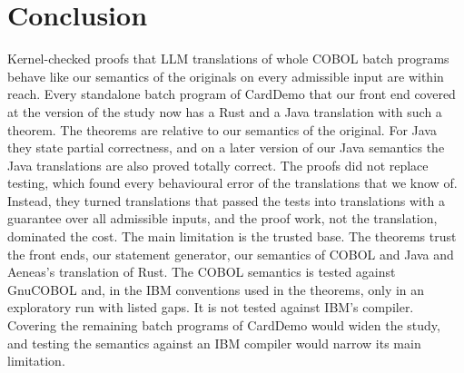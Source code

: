 \section{Conclusion}
\label{sec:conclusion}

Kernel-checked proofs that LLM translations of whole COBOL batch programs behave like our semantics of the originals on
every admissible input are within reach. Every standalone batch program of CardDemo that our front end covered at the version of the study now has a Rust and a
Java translation with such a theorem. The theorems are relative to our semantics of the original. For Java they state
partial correctness, and on a later version of our Java semantics the Java translations are also proved totally
correct. The proofs did not
replace testing, which found every behavioural error of the translations that we know of. Instead, they turned translations that passed the tests into translations
with a guarantee over all admissible inputs, and the proof work, not the translation, dominated the cost. The main limitation is the trusted base. The theorems trust the front ends, our statement generator, our semantics of
COBOL and Java and Aeneas's translation of Rust. The COBOL semantics is tested against GnuCOBOL and, in the IBM conventions used in the theorems, only in an exploratory run with listed gaps. It is not tested against
IBM's compiler. Covering the remaining batch
programs of CardDemo would widen the study, and testing the semantics against an IBM compiler would narrow its main
limitation.
